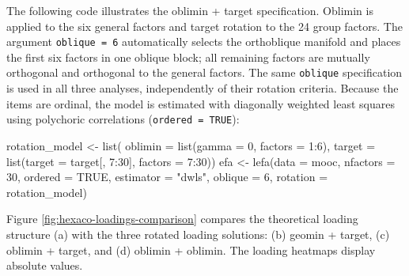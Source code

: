 \documentclass[
  12pt,
  letterpaper,
  article]{scrartcl}
\newenvironment{Shaded}{\begin{snugshade}}{\end{snugshade}}
\newcommand{\AttributeTok}[1]{\textcolor[rgb]{0.40,0.45,0.13}{#1}}
\newcommand{\ConstantTok}[1]{\textcolor[rgb]{0.56,0.35,0.01}{#1}}
\newcommand{\DecValTok}[1]{\textcolor[rgb]{0.68,0.00,0.00}{#1}}
\newcommand{\FunctionTok}[1]{\textcolor[rgb]{0.28,0.35,0.67}{#1}}
\newcommand{\NormalTok}[1]{\textcolor[rgb]{0.00,0.23,0.31}{#1}}
\newcommand{\OtherTok}[1]{\textcolor[rgb]{0.00,0.23,0.31}{#1}}
\newcommand{\SpecialCharTok}[1]{\textcolor[rgb]{0.37,0.37,0.37}{#1}}
\newcommand{\StringTok}[1]{\textcolor[rgb]{0.13,0.47,0.30}{#1}}
\begin{document}
The following code illustrates the oblimin + target specification.
Oblimin is applied to the six general factors and target rotation to the
24 group factors. The argument \texttt{oblique = 6} automatically
selects the orthoblique manifold and places the first six factors in one
oblique block; all remaining factors are mutually orthogonal and
orthogonal to the general factors. The same \texttt{oblique}
specification is used in all three analyses, independently of their
rotation criteria. Because the items are ordinal, the model is estimated
with diagonally weighted least squares using polychoric correlations
(\texttt{ordered = TRUE}):

\begin{Shaded}
\begin{Highlighting}[]
\NormalTok{rotation\_model }\OtherTok{\textless{}{-}} \FunctionTok{list}\NormalTok{(}
  \AttributeTok{oblimin =} \FunctionTok{list}\NormalTok{(}\AttributeTok{gamma =} \DecValTok{0}\NormalTok{, }\AttributeTok{factors =} \DecValTok{1}\SpecialCharTok{:}\DecValTok{6}\NormalTok{),}
  \AttributeTok{target  =} \FunctionTok{list}\NormalTok{(}\AttributeTok{target =}\NormalTok{ target[, }\DecValTok{7}\SpecialCharTok{:}\DecValTok{30}\NormalTok{], }\AttributeTok{factors =} \DecValTok{7}\SpecialCharTok{:}\DecValTok{30}\NormalTok{))}
\NormalTok{efa }\OtherTok{\textless{}{-}} \FunctionTok{lefa}\NormalTok{(}\AttributeTok{data =}\NormalTok{ mooc, }
            \AttributeTok{nfactors =} \DecValTok{30}\NormalTok{,}
            \AttributeTok{ordered =} \ConstantTok{TRUE}\NormalTok{, }
            \AttributeTok{estimator =} \StringTok{"dwls"}\NormalTok{,}
            \AttributeTok{oblique =} \DecValTok{6}\NormalTok{,}
            \AttributeTok{rotation =}\NormalTok{ rotation\_model)}
\end{Highlighting}
\end{Shaded}

Figure \ref{fig:hexaco-loadings-comparison} compares the theoretical
loading structure (a) with the three rotated loading solutions: (b)
geomin + target, (c) oblimin + target, and (d) oblimin + oblimin. The
loading heatmaps display absolute values.
\end{document}
